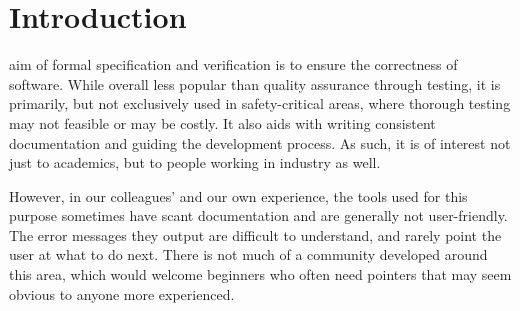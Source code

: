 \documentclass[12pt,journal,duplex]{IEEEtran}
\begin{document}

	\maketitle


	\IEEEdisplaynotcompsoctitleabstractindextext


	\IEEEpeerreviewmaketitle
	\clearpage
	\tableofcontents
	\clearpage
	\twocolumn
	\section{Introduction}
	 aim of formal specification and verification is to ensure the correctness of software. While overall less popular than quality assurance through testing, it is primarily, but not exclusively used in safety-critical areas, where thorough testing may not feasible or may be costly. It also aids with writing consistent documentation and guiding the development process. As such, it is of interest not just to academics, but to people working in industry as well.
	
	However, in our colleagues' and our own experience, the tools used for this purpose sometimes have scant documentation and are generally not user-friendly. The error messages they output are difficult to understand, and rarely point the user at what to do next. There is not much of a community developed around this area, which would welcome beginners who often need pointers that may seem obvious to anyone more experienced.
\end{document}
